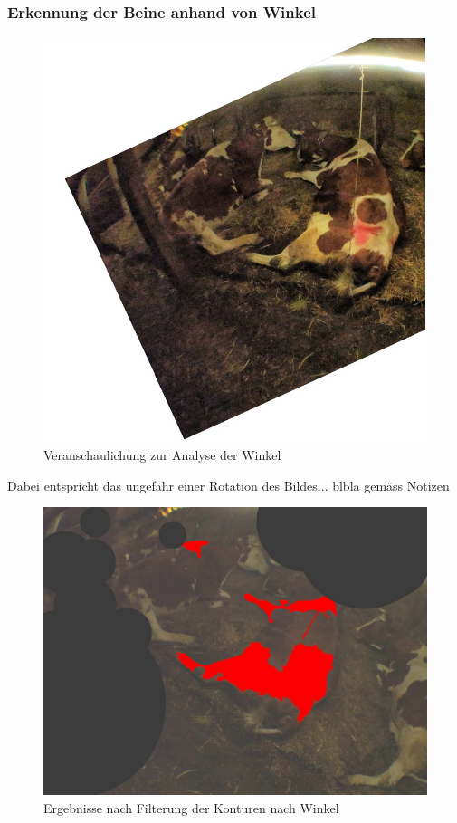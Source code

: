 \subsubsection{Erkennung der Beine anhand von Winkel}
\begin{figure}[H]
	\center
	\includegraphics[scale=1.8]{Grafiken/entwicklung/21AngleCorrecturDemonstration.jpg}
	\caption{Veranschaulichung zur Analyse der Winkel} 
	\label{fig: Veranschaulichung zur Analyse der Winkel} 
\end{figure}


Dabei entspricht das ungefähr einer Rotation des Bildes... blbla gemäss Notizen

\begin{figure}[H]
	\center
	\includegraphics[scale=0.43]{Grafiken/entwicklung/22AngleCorrectur.jpg}
	\caption{Ergebnisse nach Filterung der Konturen nach Winkel} 
	\label{fig: Ergebnisse nach Filterung der Konturen nach Winkel} 
\end{figure}
